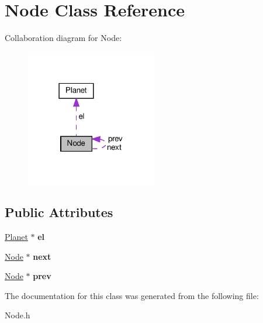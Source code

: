 \hypertarget{classNode}{}\section{Node Class Reference}
\label{classNode}


Collaboration diagram for Node\+:\nopagebreak
\begin{figure}[H]
\begin{center}
\leavevmode
\includegraphics[width=162pt]{classNode__coll__graph}
\end{center}
\end{figure}
\subsection*{Public Attributes}
\begin{DoxyCompactItemize}
\item 
\mbox{\label{classNode_a51f48c998114cf08deebf34302472302}} 
\hyperlink{classPlanet}{Planet} $\ast$ {\bfseries el}
\item 
\mbox{\label{classNode_a2559a716f69ccaa76d648d9f1b83065e}} 
\hyperlink{classNode}{Node} $\ast$ {\bfseries next}
\item 
\mbox{\label{classNode_a632ea91c6a13082308f7692649a68880}} 
\hyperlink{classNode}{Node} $\ast$ {\bfseries prev}
\end{DoxyCompactItemize}


The documentation for this class was generated from the following file\+:\begin{DoxyCompactItemize}
\item 
Node.\+h\end{DoxyCompactItemize}
